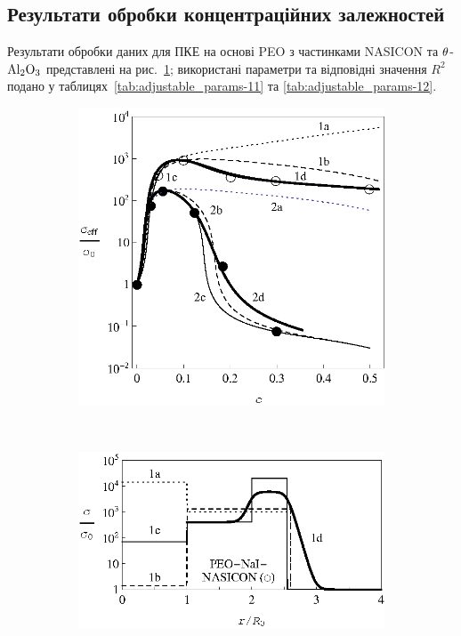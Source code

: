 \documentclass[14pt,twoside]{vakthesis}
\begin{document}
\subsection{Результати обробки концентраційних залежностей}%

Результати обробки даних \cite{Przl1995, Wiec1994} для ПКЕ на основі PEO з частинками NASICON та $\rm \theta$-$\rm Al_2O_3$ представлені на рис.~\ref{fig:PEO-NaIa}; використані параметри та відповідні значення $R^2$ подано у таблицях~\ref{tab:adjustable_params-11} та \ref{tab:adjustable_params-12}. 
\begin{figure}[!t]
	\centering
	\begin{subfigure}[c]{0.54\textwidth}
		\includegraphics[width=\textwidth]{Fig2_PEO-NaI_NASICON_PEO-NaI-theta-Al2O3.eps}
		\caption{} \label{fig:PEO-NaIa}
	\end{subfigure}%
	~
	\begin{subfigure}[c]{0.45\textwidth}
		\includegraphics[width=\textwidth]{Fig2_PEO-NaI_NASICON_Profile.eps}

\end{subfigure}
\end{figure}
\end{document}
